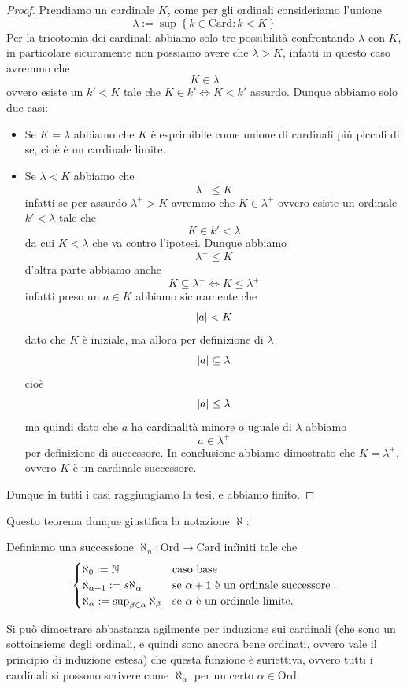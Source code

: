 \documentclass[11pt]{scrartcl}
\begin{document}
 	\begin{proof}
 		Prendiamo un cardinale $K$, come per gli ordinali consideriamo l'unione 
 		$$\lambda:=\sup\left\{k\in \text{Card}:k<K\right\}$$
 		Per la tricotomia dei cardinali abbiamo solo tre possibilità confrontando $\lambda$ con $K$, in particolare sicuramente non possiamo avere che $\lambda > K$, infatti in questo caso avremmo che 
 		$$K\in \lambda$$
 		ovvero esiste un $k'<K$ tale che $K\in k' \iff K<k'$ assurdo. Dunque abbiamo solo due casi:
 		\begin{itemize}
 			\item Se $K=\lambda$ abbiamo che $K$ è esprimibile come unione di cardinali più piccoli di se, cioè è un cardinale limite.
 			\item Se $\lambda<K$ abbiamo che $$\lambda^+\le K$$
 			infatti se per assurdo $\lambda^+>K$ avremmo che $K\in \lambda^+$ ovvero esiste un ordinale $k'<\lambda$ tale che 
 			$$K\in k'<\lambda$$
 			da cui $K<\lambda$ che va contro l'ipotesi. Dunque abbiamo
 			$$\lambda^+\le K$$
 			d'altra parte abbiamo anche 
 			$$K\subseteq \lambda^+ \iff K\le \lambda^+$$
 			infatti preso un $a\in K$ abbiamo sicuramente che 
 			$$\left\lvert a \right\rvert<K$$
 			dato che $K$ è iniziale, ma allora per definizione di $\lambda$
 			$$\left\lvert a \right\rvert\subseteq \lambda$$
 			cioè
 			$$\left\lvert a \right\rvert\le \lambda$$
 			ma quindi dato che $a$ ha cardinalità minore o uguale di $\lambda$ abbiamo
 			$$a\in \lambda^+$$
 			per definizione di successore. In conclusione abbiamo dimostrato che $K=\lambda^+$, ovvero $K$ è un cardinale successore. 
 		\end{itemize}
 		Dunque in tutti i casi raggiungiamo la tesi, e abbiamo finito.
  	\end{proof}
 	Questo teorema dunque giustifica la notazione $\aleph$:
 	\begin{definition}
 		Definiamo una successione $\aleph_n:\text{Ord}\to \text{Card infiniti}$ tale che
 		$$
 		\begin{cases}
 			\aleph_0:=\mathbb N & \text{caso base} \\
 			\aleph_{\alpha+1}:=s\aleph_\alpha & \text{se $\alpha+1$ è un ordinale successore} \\
 			\aleph_\alpha:=\sup_{\beta\in \alpha}\aleph_\beta & \text{se $\alpha$ è un ordinale limite.}
 		\end{cases}.
 		$$
 	\end{definition}
 	Si può dimostrare abbastanza agilmente per induzione sui cardinali (che sono un sottoinsieme degli ordinali, e quindi sono ancora bene ordinati, ovvero vale il principio di induzione estesa) che questa funzione è suriettiva, ovvero tutti i cardinali si possono scrivere come $\aleph_\alpha$ per un certo $\alpha\in \text{Ord}$.
\end{document}
